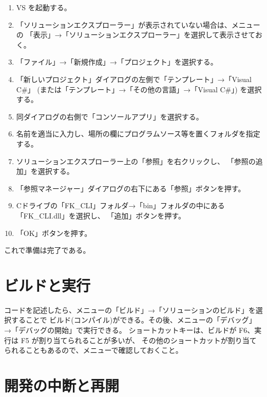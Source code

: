 \documentclass[a4paper]{jsarticle}
\begin{document}
\begin{enumerate}

 \item VS を起動する。

 \item 「ソリューションエクスプローラー」が表示されていない場合は、メニューの
	「表示」→「ソリューションエクスプローラー」を選択して表示させておく。

 \item 「ファイル」→「新規作成」→「プロジェクト」を選択する。

 \item 「新しいプロジェクト」ダイアログの左側で「テンプレート」→「Visual C\#」
	(または「テンプレート」→「その他の言語」→「Visual C\#」) を選択する。

 \item 同ダイアログの右側で「コンソールアプリ」を選択する。

 \item 名前を適当に入力し、場所の欄にプログラムソース等を置くフォルダを指定する。

 \item ソリューションエクスプローラー上の「参照」を右クリックし、
	「参照の追加」を選択する。

 \item 「参照マネージャー」ダイアログの右下にある「参照」ボタンを押す。

 \item Cドライブの「FK\_CLI」フォルダ→「bin」フォルダの中にある「FK\_CLI.dll」を選択し、
	「追加」ボタンを押す。

 \item 「OK」ボタンを押す。

\end{enumerate}

これで準備は完了である。

\section{ビルドと実行}

コードを記述したら、メニューの「ビルド」→「ソリューションのビルド」を選択することで
ビルド(コンパイル)ができる。その後、メニューの「デバッグ」→「デバッグの開始」で実行できる。
ショートカットキーは、ビルドが F6、実行は F5 が割り当てられることが多いが、
その他のショートカットが割り当てられることもあるので、メニューで確認しておくこと。

\section{開発の中断と再開}
\end{document}
